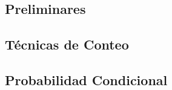 \documentclass[../main.tex]{subfiles}
\begin{document}
\subsection{Preliminares}

\clearpage

\subsection{Técnicas de Conteo}

\clearpage

\subsection{Probabilidad Condicional}

\clearpage
\end{document}
